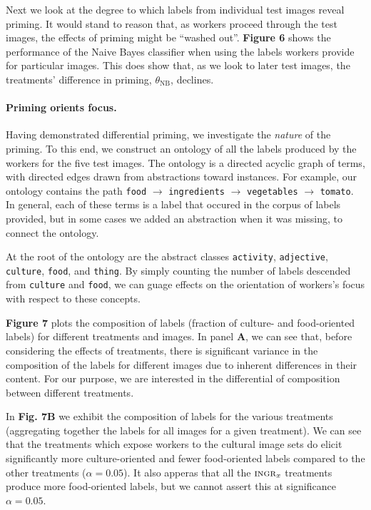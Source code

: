 \documentclass[a4paper]{report}
\begin{document}
Next we look at the degree to which labels from individual test images reveal 
priming.  It would stand to reason that, as workers proceed through 
the test images, the effects of priming might be ``washed out''.  
\textbf{Figure 6} shows the
performance of the Naive Bayes classifier when using the labels workers provide
for particular images.  This does show that, as we look to later test images, 
the treatments' difference in priming, $\theta_\text{NB}$, declines.  

\paragraph{Priming orients focus.} Having demonstrated differential 
priming, we investigate the \textit{nature} of the priming.  To this
end, we construct an ontology of all the labels produced by the workers
for the five test images.  The ontology is a directed acyclic graph of terms,
with directed edges drawn from abstractions toward instances.  For example,
our ontology contains the path \texttt{food} $\to$ \texttt{ingredients} $\to$ 
\texttt{vegetables} 
$\to$ \texttt{tomato}.  In general, each of these terms is a label that
occured in the corpus of labels provided, but in some cases we added 
an abstraction when it was missing, to connect the ontology.

At the root of the ontology are the abstract classes \texttt{activity}, 
\texttt{adjective}, \texttt{culture}, \texttt{food}, and \texttt{thing}.
By simply counting the number of labels descended from \texttt{culture}
and \texttt{food}, we can guage effects on the orientation of workers's focus
with respect to these concepts.

\textbf{Figure 7} plots the composition of labels (fraction of culture- and 
food-oriented labels) for different treatments and images.  In 
panel \textbf{A}, we can see that, before considering the effects of 
treatments, there is significant variance in the composition of the labels 
for different images due to inherent differences in their content.  For our 
purpose, we are interested in the differential of composition between 
different treatments.

In \textbf{Fig. 7B} we exhibit the composition of labels for the various 
treatments (aggregating together the labels for all images for a given 
treatment).  We can see that the treatments which expose workers to the
cultural image sets do elicit significantly more culture-oriented and fewer
food-oriented labels compared to the other treatments ($\alpha=0.05$).  It 
also apperas that all the $\textsc{ingr}_x$ treatments produce more 
food-oriented labels, but we cannot assert this at significance 
$\alpha = 0.05$. 
\end{document}
